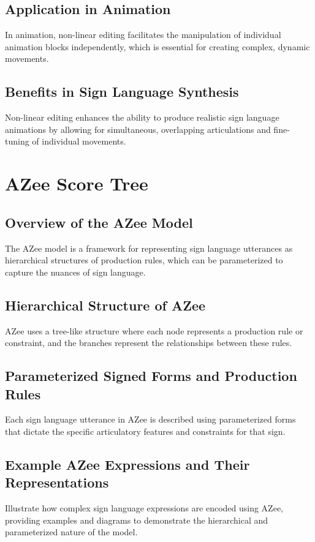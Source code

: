 \documentclass[../../main.tex]{subfiles}
\begin{document}
\subsection{Application in Animation}
In animation, non-linear editing facilitates the manipulation of individual animation blocks independently, which is essential for creating complex, dynamic movements.

\subsection{Benefits in Sign Language Synthesis}
Non-linear editing enhances the ability to produce realistic sign language animations by allowing for simultaneous, overlapping articulations and fine-tuning of individual movements.

\section{AZee Score Tree}
\subsection{Overview of the AZee Model}
The AZee model is a framework for representing sign language utterances as hierarchical structures of production rules, which can be parameterized to capture the nuances of sign language.

\subsection{Hierarchical Structure of AZee}
AZee uses a tree-like structure where each node represents a production rule or constraint, and the branches represent the relationships between these rules.

\subsection{Parameterized Signed Forms and Production Rules}
Each sign language utterance in AZee is described using parameterized forms that dictate the specific articulatory features and constraints for that sign.

\subsection{Example AZee Expressions and Their Representations}
Illustrate how complex sign language expressions are encoded using AZee, providing examples and diagrams to demonstrate the hierarchical and parameterized nature of the model.
\end{document}
